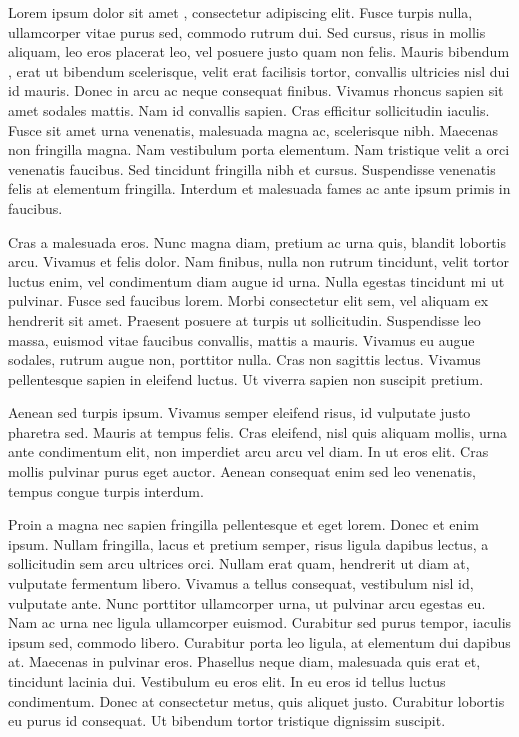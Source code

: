 

Lorem ipsum dolor sit amet \parencite[see][]{einstein}, consectetur adipiscing elit. Fusce turpis nulla, ullamcorper vitae purus sed, commodo rutrum dui. Sed cursus, risus in mollis aliquam, leo eros placerat leo, vel posuere justo quam non felis. Mauris bibendum \cite{knuthwebsite}, erat ut bibendum scelerisque, velit erat facilisis tortor, convallis ultricies nisl dui id mauris. Donec in arcu ac neque consequat finibus. Vivamus rhoncus sapien sit amet sodales mattis. Nam id convallis sapien. Cras efficitur sollicitudin iaculis. Fusce sit amet urna venenatis, malesuada magna ac, scelerisque nibh. Maecenas non fringilla magna. Nam vestibulum porta elementum. Nam tristique velit a orci venenatis faucibus. Sed tincidunt fringilla nibh et cursus. Suspendisse venenatis felis at elementum fringilla. Interdum \cite{latexcompanion} et malesuada fames ac ante ipsum primis in faucibus.

Cras a malesuada eros. Nunc magna diam, pretium ac urna quis, blandit lobortis arcu. Vivamus et felis dolor. Nam finibus, nulla non rutrum tincidunt, velit tortor luctus enim, vel condimentum diam augue id urna. Nulla egestas tincidunt mi ut pulvinar. Fusce sed faucibus lorem. Morbi consectetur elit sem, vel aliquam ex hendrerit sit amet. Praesent posuere at turpis ut sollicitudin. Suspendisse leo massa, euismod vitae faucibus convallis, mattis a mauris. Vivamus eu augue sodales, rutrum augue non, porttitor nulla. Cras non sagittis lectus. Vivamus pellentesque sapien in eleifend luctus. Ut viverra sapien non suscipit pretium.

Aenean sed turpis ipsum. Vivamus semper eleifend risus, id vulputate justo pharetra sed. Mauris at tempus felis. Cras eleifend, nisl quis aliquam mollis, urna ante condimentum elit, non imperdiet arcu arcu vel diam. In ut eros elit. Cras mollis pulvinar purus eget auctor. Aenean consequat enim sed leo venenatis, tempus congue turpis interdum.

Proin a magna nec sapien fringilla pellentesque et eget lorem. Donec et enim ipsum. Nullam fringilla, lacus et pretium semper, risus ligula dapibus lectus, a sollicitudin sem arcu ultrices orci. Nullam erat quam, hendrerit ut diam at, vulputate fermentum libero. Vivamus a tellus consequat, vestibulum nisl id, vulputate ante. Nunc porttitor ullamcorper urna, ut pulvinar arcu egestas eu. Nam ac urna nec ligula ullamcorper euismod. Curabitur sed purus tempor, iaculis ipsum sed, commodo libero. Curabitur porta leo ligula, at elementum dui dapibus at. Maecenas in pulvinar eros. Phasellus neque diam, malesuada quis erat et, tincidunt lacinia dui. Vestibulum eu eros elit. In eu eros id tellus luctus condimentum. Donec at consectetur metus, quis aliquet justo. Curabitur lobortis eu purus id consequat. Ut bibendum tortor tristique dignissim suscipit.

